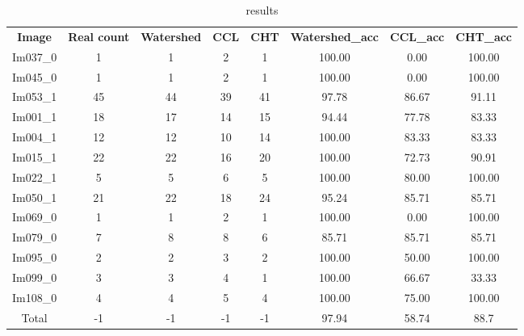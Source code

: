 \begin{table}[H]
\centering
\begin{tabular}{|  c | c | c | c | c | c | c | c |}
\hline
\textbf{Image} & \textbf{Real count} & \textbf{Watershed} & \textbf{CCL} & \textbf{CHT} & \textbf{Watershed\_acc} & \textbf{CCL\_acc} & \textbf{CHT\_acc} \\
Im037\_0 & 1 & 1 & 2 & 1 & 100.00 & 0.00 & 100.00 \\
Im045\_0 & 1 & 1 & 2 & 1 & 100.00 & 0.00 & 100.00 \\
Im053\_1 & 45 & 44 & 39 & 41 & 97.78 & 86.67 & 91.11 \\
Im001\_1 & 18 & 17 & 14 & 15 & 94.44 & 77.78 & 83.33 \\
Im004\_1 & 12 & 12 & 10 & 14 & 100.00 & 83.33 & 83.33 \\
Im015\_1 & 22 & 22 & 16 & 20 & 100.00 & 72.73 & 90.91 \\
Im022\_1 & 5 & 5 & 6 & 5 & 100.00 & 80.00 & 100.00 \\
Im050\_1 & 21 & 22 & 18 & 24 & 95.24 & 85.71 & 85.71 \\
Im069\_0 & 1 & 1 & 2 & 1 & 100.00 & 0.00 & 100.00 \\
Im079\_0 & 7 & 8 & 8 & 6 & 85.71 & 85.71 & 85.71 \\
Im095\_0 & 2 & 2 & 3 & 2 & 100.00 & 50.00 & 100.00 \\
Im099\_0 & 3 & 3 & 4 & 1 & 100.00 & 66.67 & 33.33 \\
Im108\_0 & 4 & 4 & 5 & 4 & 100.00 & 75.00 & 100.00 \\
Total & -1 & -1 & -1 & -1 & 97.94 & 58.74 & 88.7 \\
\hline
\end{tabular}
\caption{results}
\label{table:result}
\end{table}